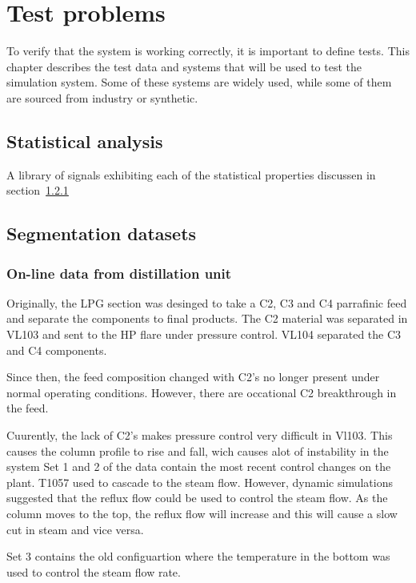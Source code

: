 \chapter{Test problems}
\begin{overview}
To verify that the system is working correctly, it is important to define tests.
This chapter describes the test data and systems that will be used to test the simulation system.
Some of these systems are widely used, while some of them are sourced from industry or synthetic.
\end{overview}

\section{Statistical analysis}
A library of signals exhibiting each of the statistical properties discussen in section~\ref{}

\section{Segmentation datasets}
\subsection{On-line data from distillation unit}
Originally, the LPG section was desinged to take a C2, C3 and C4 parrafinic feed and separate the components to final products. 
The C2 material was separated in VL103 and sent to the HP flare under pressure control. 
VL104 separated the C3 and C4 components.
 
Since then, the feed composition changed with C2's no longer present under normal operating conditions. 
However, there are occational C2 breakthrough in the feed.
 
Cuurently, the lack of C2's makes pressure control very difficult in Vl103. 
This causes the column profile to rise and fall, wich causes alot of instability in the system Set 1 and 2 of the data contain the most recent control changes on the plant. 
T1057 used to cascade to the steam flow. 
However, dynamic simulations suggested that the reflux flow could be used to control the steam flow. 
As the column moves to the top, the reflux flow will increase and this will cause a slow cut in steam and vice versa.
 
Set 3 contains the old configuartion where the temperature in the bottom was used to control the steam flow rate.

